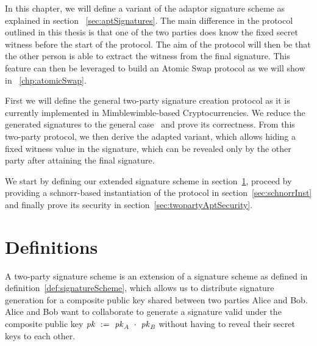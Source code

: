 In this chapter, we will define a variant of the adaptor signature scheme as explained in section ~\ref{sec:aptSignatures}.
The main difference in the protocol outlined in this thesis is that one of the two parties does know the fixed secret witness before the start of the protocol.
The aim of the protocol will then be that the other person is able to extract the witness from the final signature. This feature can then be leveraged to build an Atomic Swap protocol as we
will show in ~\ref{chp:atomicSwap}.


First we will define the general two-party signature creation protocol as it is currently implemented in Mimblewimble-based Cryptocurrencies.
We reduce the generated signatures to the general case~\cite{schnorr1989efficient} and prove its correctness.
From this two-party protocol, we then derive the adapted variant, which allows hiding a fixed witness
value in the signature, which can be revealed only by the other party after attaining the final signature.


We start by defining our extended signature scheme in section~\ref{sec:definitions},
proceed by providing a schnorr-based instantiation of the protocol in section~\ref{sec:schnorrInst} and finally prove its security in section~\ref{sec:twopartyAptSecurity}.


\section{Definitions}\label{sec:definitions}

A two-party signature scheme is an extension of a signature scheme as defined in definition~\ref{def:signatureScheme}, which allows us to distribute signature generation for a composite public key shared between two parties Alice and Bob.
Alice and Bob want to collaborate to generate a signature valid under the composite public key $\mathit{pk} ~:=~ \mathit{pk}_{\mathit{A}} ~\cdot~ \mathit{pk}_{\mathit{B}}$ without having to reveal their secret keys to each other.

